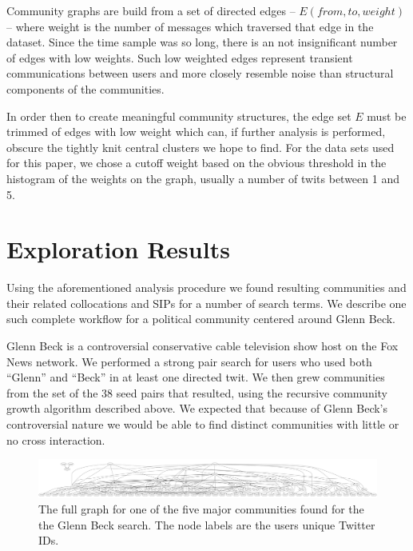 \documentclass[10pt,oneside]{memoir}
\begin{document}
Community graphs are build from a set of directed edges --
$E(from,to,weight)$ -- where weight is the number of messages which
traversed that edge in the dataset. Since the time sample was so
long, there is an not insignificant number of edges with low
weights. Such low weighted edges represent transient communications
between users and more closely resemble noise than structural
components of the communities.


In order then to create meaningful community structures, the edge
set $E$ must be trimmed of edges with low weight which can, if
further analysis is performed, obscure the tightly knit central
clusters we hope to find. For the data sets used for this paper, we
chose a cutoff weight based on the obvious threshold in the
histogram of the weights on the graph, usually a number of twits
between 1 and 5.


\pagebreak \section{Exploration Results}
\label{explorationresults}

Using the aforementioned analysis procedure we found resulting communities and their related collocations and SIPs for a number of search terms.  We describe one such complete workflow for a political community centered around Glenn Beck.


Glenn Beck is a controversial conservative cable television show host on the Fox News network.  We performed a strong pair search for users who used both ``Glenn'' and ``Beck'' in at least one directed twit.  We then grew communities from the set of the 38 seed pairs that resulted, using the recursive community growth algorithm described above.  We expected that because of Glenn Beck's controversial nature we would be able to find distinct communities with little or no cross interaction.



\begin{figure}
\begin{center}
\includegraphics[width=6in]{figures/gb5}
\caption{The full graph for one of the five major communities found for the the Glenn Beck search.  The node labels are the users unique Twitter IDs.}
\label{figure:gb-full}
\end{center}
\end{figure}
\end{document}
